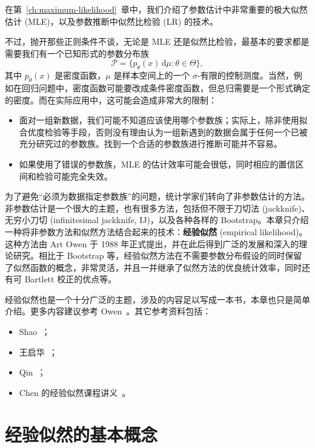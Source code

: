 在第~\ref{ch:maximum-likelihood}~章中，我们介绍了参数估计中非常重要的极大似然估计 (MLE)，以及参数推断中似然比检验 (LR) 的技术。

不过，抛开那些正则条件不谈，无论是 MLE 还是似然比检验，最基本的要求都是需要我们有一个已知形式的参数分布族
\[
\mathscr P=\{p_\theta(x)\,\mathrm d\mu:\theta\in\Theta\},
\]
其中 $p_\theta(x)$ 是密度函数，$\mu$ 是样本空间上的一个 $\sigma$-有限的控制测度。当然，例如在回归问题中，密度函数可能要改成条件密度函数，但总归需要是一个形式确定的密度。而在实际应用中，这可能会造成非常大的限制：
\begin{itemize}
\item 面对一组新数据，我们可能不知道应该使用哪个参数族；实际上，除非使用拟合优度检验等手段，否则没有理由认为一组新遇到的数据会属于任何一个已被充分研究过的参数族。找到一个合适的参数族进行推断可能并不容易。
\item 如果使用了错误的参数族，MLE 的估计效率可能会很低，同时相应的置信区间和检验可能完全失效。
\end{itemize}

为了避免“必须为数据指定参数族”的问题，统计学家们转向了非参数估计的方法。非参数估计是一个很大的主题，也有很多方法，包括但不限于刀切法 (jackknife)、无穷小刀切 (infinitesimal jackknife, IJ)，以及各种各样的 Bootstrap。本章只介绍一种将非参数方法和似然方法结合起来的技术：\textbf{经验似然} (empirical likelihood)。这种方法由 Art Owen 于 1988 年正式提出，并在此后得到广泛的发展和深入的理论研究。相比于 Bootstrap 等，经验似然方法在不需要参数分布假设的同时保留了似然函数的概念，非常灵活，并且一并继承了似然方法的优良统计效率，同时还有可 Bartlett 校正的优点等。

经验似然也是一个十分广泛的主题，涉及的内容足以写成一本书，本章也只是简单介绍。更多内容建议参考 Owen~\cite{owen2001}。其它参考资料包括：
\begin{itemize}
\item Shao~\cite[第 5.1.2、6.5.3 节]{shao2003}；
\item 王启华~\cite{wangqihua2004}；
\item Qin~\cite[第 8 章]{qin2017}；
\item Chen 的经验似然课程讲义~\cite{chen2021el}。
\end{itemize}

\section{经验似然的基本概念}


